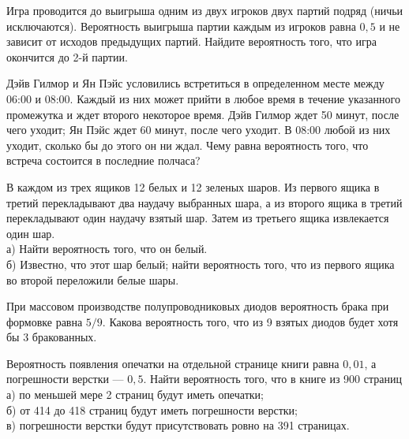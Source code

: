 \newpage\setcounter{zad}{0}



\begin{zkrW}{20}\noindent 
	Игра проводится до выигрыша одним из двух игроков двух партий подряд (ничьи исключаются). Вероятность выигрыша партии каждым из игроков равна $0{,}5$ и не зависит от исходов предыдущих партий. Найдите вероятность того, что игра окончится до 2-й партии.
 
\end{zkrW}

\begin{zkrW}{20}\noindent 
	Дэйв Гилмор и Ян Пэйс условились встретиться в определенном месте между 06:00 и 08:00. Каждый из них может прийти в любое время в течение указанного промежутка и ждет второго некоторое время. Дэйв Гилмор ждет 50 минут, после чего уходит; Ян Пэйс ждет 60 минут, после чего уходит. В 08:00 любой из них уходит, сколько бы до этого он ни ждал. Чему равна вероятность того, что встреча состоится в последние полчаса?
 
\end{zkrW}

\begin{zkrW}{20}\noindent 
	В каждом из трех ящиков 12 белых и 12 зеленых шаров. Из первого ящика в третий перекладывают два наудачу выбранных шара, а из второго ящика в третий перекладывают один наудачу взятый шар. Затем из третьего ящика извлекается один шар. \\ \indent а) Найти вероятность того, что он белый. \\ \indent б) Известно, что этот шар белый; найти вероятность того, что из первого ящика во второй переложили белые шары.
 
\end{zkrW}

\begin{zkrW}{20}\noindent 
	При массовом производстве полупроводниковых диодов вероятность брака при формовке равна $5/9$. Какова вероятность того, что из 9 взятых диодов будет хотя бы 3 бракованных.
 
\end{zkrW}

\begin{zkrW}{20}\noindent 
	Вероятность появления опечатки на отдельной странице книги равна $0{,}01$, а погрешности верстки --- $0{,}5$. Найти вероятность того, что в книге из 900 страниц \\ \indent а) по меньшей мере 2 страниц будут иметь опечатки; \\ \indent б) от 414 до 418 страниц будут иметь погрешности верстки; \\ \indent в) погрешности верстки будут присутствовать ровно на 391 страницах.
 
\end{zkrW}

